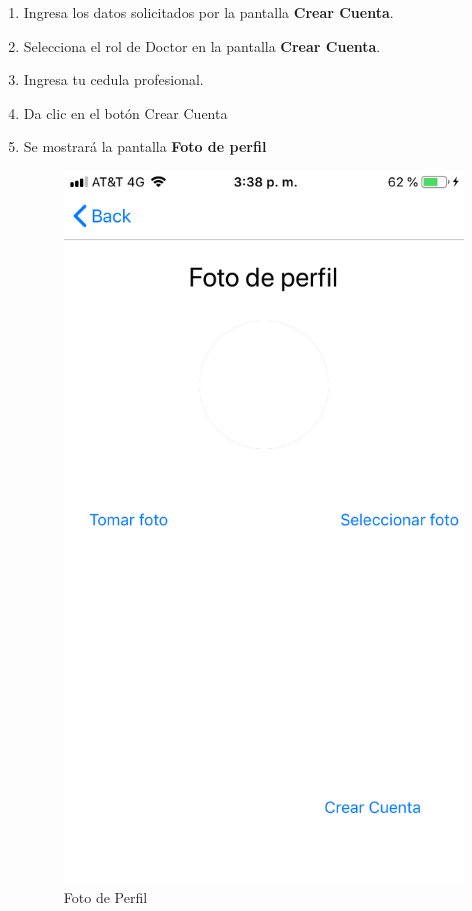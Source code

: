 \begin{enumerate}
	\item Ingresa los datos solicitados por la pantalla \textbf{Crear Cuenta}.
	
	\item Selecciona el rol de Doctor en la pantalla \textbf{Crear Cuenta}.
	
	\item Ingresa tu cedula profesional.
	
	\item Da clic en el botón Crear Cuenta
	
	\item Se mostrará la pantalla \textbf{Foto de perfil}
	\newpage
	\begin{figure}[!htbp]			
		\hypertarget{fig:fotoPerfil}{\hspace{1pt}}
		\begin{center}
			\includegraphics[height=0.4\textheight]{Paciente/RegistrodeCuenta/images/IMG-3182}
			\caption{Foto de Perfil}
			\label{fig:fotoPerfil}
		\end{center}
	\end{figure}


\end{enumerate}
